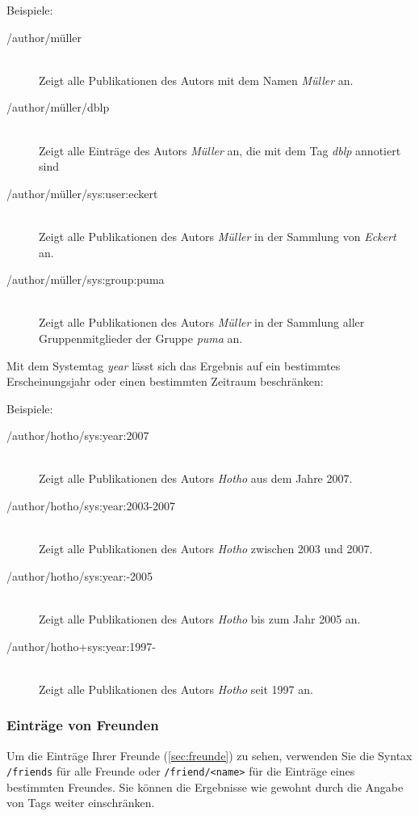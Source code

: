 Beispiele:
\begin{description}
    \item [/author/müller] \hfill \\
    Zeigt alle Publikationen des Autors mit dem Namen \textit{Müller} an.
    \item [/author/müller/dblp] \hfill \\
    Zeigt alle Einträge des Autors \textit{Müller} an, die mit dem Tag \textit{dblp} annotiert sind
    \item [/author/müller/sys:user:eckert] \hfill \\
    Zeigt alle Publikationen des Autors \textit{Müller} in der Sammlung von \textit{Eckert} an.
    \item [/author/müller/sys:group:puma] \hfill \\
    Zeigt alle Publikationen des Autors \textit{Müller} in der Sammlung aller Gruppenmitglieder der Gruppe \textit{puma} an. 
\end{description}

Mit dem Systemtag \textit{year} lässt sich das Ergebnis auf ein bestimmtes Erscheinungsjahr oder einen bestimmten Zeitraum beschränken:%

Beispiele:
\begin{description}
    \item [/author/hotho/sys:year:2007] \hfill \\
    Zeigt alle Publikationen des Autors \textit{Hotho} aus dem Jahre 2007.
    \item [/author/hotho/sys:year:2003-2007] \hfill \\
    Zeigt alle Publikationen des Autors \textit{Hotho} zwischen 2003 und 2007.
    \item [/author/hotho/sys:year:-2005] \hfill \\
    Zeigt alle Publikationen des Autors \textit{Hotho} bis zum Jahr 2005 an.
    \item [/author/hotho+sys:year:1997-] \hfill \\
    Zeigt alle Publikationen des Autors \textit{Hotho} seit 1997 an.
\end{description}

\subsubsection*{Einträge von Freunden} 
\label{sss:vonFreunden}
Um die Einträge Ihrer Freunde (\autoref{sec:freunde}) zu sehen, verwenden Sie die Syntax \texttt{/friends} für alle Freunde oder \texttt{/friend/<name>} für die Einträge eines bestimmten Freundes. Sie können die Ergebnisse wie gewohnt durch die Angabe von Tags weiter einschränken. 

